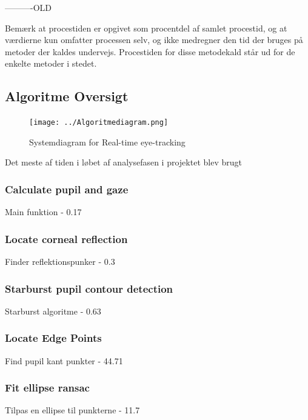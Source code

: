 \documentclass[rapport.tex]{subfiles}
\begin{document}
	
	
	----------OLD
	
	Bemærk at procestiden er opgivet som procentdel af samlet procestid, og at værdierne kun omfatter processen selv, og ikke medregner den tid der bruges på metoder der kaldes undervejs. Procestiden for disse metodekald står ud for de enkelte metoder i stedet.
	
	\subsection{Algoritme Oversigt}
	\begin{figure}[h]
		\centering
		\texttt{[image: ../Algoritmediagram.png]}
		\caption[Systemdiagram]{Systemdiagram for Real-time eye-tracking}
		\label{fig:Systemdiagram}
	\end{figure}
	
	Det meste af tiden i løbet af analysefasen i projektet blev brugt 
	
	\subsubsection{Calculate pupil and gaze}
	
	Main funktion - 0.17%
	
	\subsubsection{Locate corneal reflection}
	
	Finder reflektionspunker - 0.3%
	
	\subsubsection{Starburst pupil contour detection}
	
	Starburst algoritme - 0.63%
	
	\subsubsection{Locate Edge Points}
	
	Find pupil kant punkter - 44.71%
	
	\subsubsection{Fit ellipse ransac}
	
	Tilpas en ellipse til punkterne - 11.7%
	
\end{document}
